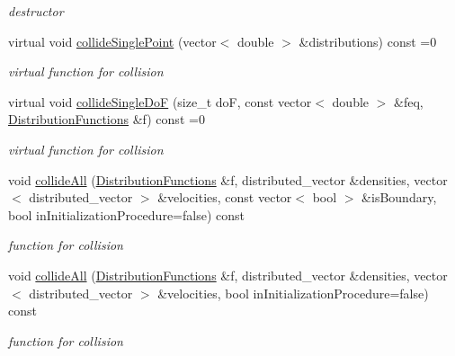 \begin{DoxyCompactItemize}
\begin{DoxyCompactList}\small\item\em destructor \end{DoxyCompactList}\item 
virtual void \hyperlink{classnatrium_1_1CollisionModel_acde767e924eb2124ab3eb725543111e8}{collide\-Single\-Point} (vector$<$ double $>$ \&distributions) const =0
\begin{DoxyCompactList}\small\item\em virtual function for collision \end{DoxyCompactList}\item 
virtual void \hyperlink{classnatrium_1_1CollisionModel_abe4f58658074680b679db7b7fddd6113}{collide\-Single\-Do\-F} (size\-\_\-t do\-F, const vector$<$ double $>$ \&feq, \hyperlink{classnatrium_1_1DistributionFunctions}{Distribution\-Functions} \&f) const =0
\begin{DoxyCompactList}\small\item\em virtual function for collision \end{DoxyCompactList}\item 
void \hyperlink{classnatrium_1_1CollisionModel_a13be8de5560d98335e4710051d9aab62}{collide\-All} (\hyperlink{classnatrium_1_1DistributionFunctions}{Distribution\-Functions} \&f, distributed\-\_\-vector \&densities, vector$<$ distributed\-\_\-vector $>$ \&velocities, const vector$<$ bool $>$ \&is\-Boundary, bool in\-Initialization\-Procedure=false) const 
\begin{DoxyCompactList}\small\item\em function for collision \end{DoxyCompactList}\item 
void \hyperlink{classnatrium_1_1CollisionModel_a01fae50f538a52a86214db46c1dcaeaa}{collide\-All} (\hyperlink{classnatrium_1_1DistributionFunctions}{Distribution\-Functions} \&f, distributed\-\_\-vector \&densities, vector$<$ distributed\-\_\-vector $>$ \&velocities, bool in\-Initialization\-Procedure=false) const 
\begin{DoxyCompactList}\small\item\em function for collision \end{DoxyCompactList}\end{DoxyCompactItemize}
